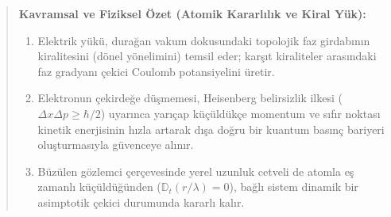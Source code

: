 \begin{quote}
    \small
    \textbf{Kavramsal ve Fiziksel Özet (Atomik Kararlılık ve Kiral Yük):}
    \begin{enumerate}
        \item Elektrik yükü, durağan vakum dokusundaki topolojik faz girdabının kiralitesini (dönel yönelimini) temsil eder; karşıt kiraliteler arasındaki faz gradyanı çekici Coulomb potansiyelini üretir.
        \item Elektronun çekirdeğe düşmemesi, Heisenberg belirsizlik ilkesi ($\Delta x \Delta p \ge \hbar/2$) uyarınca yarıçap küçüldükçe momentum ve sıfır noktası kinetik enerjisinin hızla artarak dışa doğru bir kuantum basınç bariyeri oluşturmasıyla güvenceye alınır.
        \item Büzülen gözlemci çerçevesinde yerel uzunluk cetveli de atomla eş zamanlı küçüldüğünden ($\mathbb{D}_t(r/\lambda) = 0$), bağlı sistem dinamik bir asimptotik çekici durumunda kararlı kalır.
    \end{enumerate}
\end{quote}

